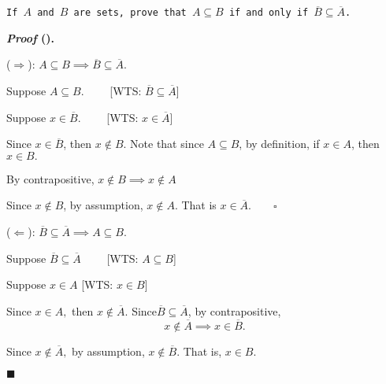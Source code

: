 \documentclass[12pt,a4paper]{article}
\newcounter{nprf}[subsection]
\newenvironment*{prf}{\par\indent\textbf{\textit{Proof} (\stepcounter{nprf}\thenprf). }\par }{\par\hfill $\blacksquare$\par}
\begin{document}
\begin{framed}
\noindent\texttt{If $A$ and $B$ are sets, prove that $A\subseteq B$ if and only if $\overline{B}\subseteq\overline{A}$.}
\begin{prf}
	($\Rightarrow$): $A\subseteq B\implies\overline{B}\subseteq\overline{A}.$\par\hspace{5mm}Suppose $A\subseteq B.$ $\qquad$[WTS: $\overline{B}\subseteq\overline{A}$]\par\hspace{5mm}Suppose $x\in\overline{B}.$ $\qquad$[WTS: $x\in\overline{A}$]\par\hspace{5mm}Since $x\in\overline{B}$, then $x\notin B$. Note that since $A\subseteq B$, by definition, if $x\in A$, then $x\in B.$\par\hspace{5mm}By contrapositive, $x\notin B\implies x\notin A$\par\hspace{5mm}Since $x\notin B$, by assumption, $x\notin A$. That is $x\in\overline{A}.$$\qquad\square$\par ($\Leftarrow$): $\overline{B}\subseteq\overline{A}\implies A\subseteq B.$\par\hspace{5mm}Suppose $\overline{B}\subseteq\overline{A}$ $\qquad$[WTS: $A\subseteq B$]\par\hspace{5mm}Suppose $x\in A$ [WTS: $x\in B$]\par\hspace{5mm}Since $x\in A,$ then $x\notin\overline{A}.$ Since$\overline{B}\subseteq\overline{A}$, by contrapositive, \[x\notin\overline{A}\implies x\in\overline{B}.\]\par\hspace{5mm}Since $x\notin\overline{A},$ by assumption, $x\notin\overline{B}$. That is, $x\in B$.
\end{prf}	
\end{framed}
\end{document}
